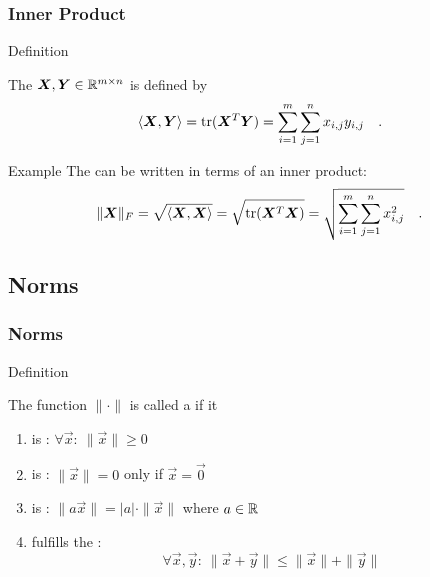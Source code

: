 \begin{frame}
  \frametitle{Inner Product \cont}

  \begin{citeblock}{Definition}

    The  ${\bm X}, {\bm Y}\in \mathbb{R}^{m\times n}$ is defined by 
    \begin{displaymath}
       \langle {\bm X}, {\bm Y} \rangle = 
       \mbox{tr}({\bm X}^T {\bm Y}) = 
       \sum_{i=1}^m \sum_{j=1}^n x_{i,j} y_{i,j} \quad .
    \end{displaymath}
  \end{citeblock}
  \pspread
  
  \begin{ovalblock}{Example}
    The  can be written in terms of an inner product:
    \begin{displaymath}
      \| {\bm X} \|_F = 
      \sqrt{ \langle {\bm X}, {\bm X} \rangle } =
      \sqrt{ \mbox{tr}({\bm X}^T {\bm X})} =
      \sqrt{ \sum_{i=1}^m \sum_{j=1}^n x_{i,j}^2} \quad .
    \end{displaymath}
  \end{ovalblock}
\end{frame}


\subsection{Norms}

\begin{frame}
  \frametitle{Norms}

  \begin{citeblock}{Definition}

    The function $\lVert\cdot\rVert$ %
    is called a  if it 
    \pause

    \begin{enumerate}
      \item is : $\forall \vec x:~ \lVert\vec x\rVert\geq 0$ \\[.3cm] \pause
      \item is : $\|\vec x\| =0$ only if $\vec x=\vec 0$ \\[.3cm] \pause 
      \item is : $\| a\vec x\|= |a|\cdot \|\vec x\|$ where $a\in \mathbb{R}$ \\[.3cm] \pause
      \item fulfills the :
      \begin{displaymath}
        \forall \vec x, \vec y:~\|\vec x+\vec y\| \leq \|\vec x\|+ \|\vec y\|
      \end{displaymath}
    \end{enumerate}
  \end{citeblock}
\end{frame}


